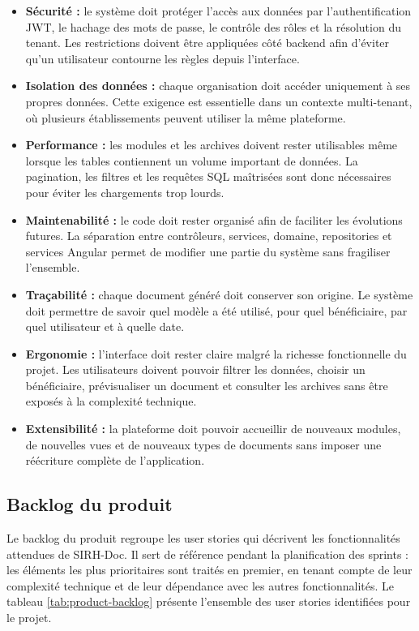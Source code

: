 \begin{itemize}
    \item \textbf{Sécurité :} le système doit protéger l'accès aux données par l'authentification JWT, le hachage des mots de passe, le contrôle des rôles et la résolution du tenant. Les restrictions doivent être appliquées côté backend afin d'éviter qu'un utilisateur contourne les règles depuis l'interface.
    \item \textbf{Isolation des données :} chaque organisation doit accéder uniquement à ses propres données. Cette exigence est essentielle dans un contexte multi-tenant, où plusieurs établissements peuvent utiliser la même plateforme.
    \item \textbf{Performance :} les modules et les archives doivent rester utilisables même lorsque les tables contiennent un volume important de données. La pagination, les filtres et les requêtes SQL maîtrisées sont donc nécessaires pour éviter les chargements trop lourds.
    \item \textbf{Maintenabilité :} le code doit rester organisé afin de faciliter les évolutions futures. La séparation entre contrôleurs, services, domaine, repositories et services Angular permet de modifier une partie du système sans fragiliser l'ensemble.
    \item \textbf{Traçabilité :} chaque document généré doit conserver son origine. Le système doit permettre de savoir quel modèle a été utilisé, pour quel bénéficiaire, par quel utilisateur et à quelle date.
    \item \textbf{Ergonomie :} l'interface doit rester claire malgré la richesse fonctionnelle du projet. Les utilisateurs doivent pouvoir filtrer les données, choisir un bénéficiaire, prévisualiser un document et consulter les archives sans être exposés à la complexité technique.
    \item \textbf{Extensibilité :} la plateforme doit pouvoir accueillir de nouveaux modules, de nouvelles vues et de nouveaux types de documents sans imposer une réécriture complète de l'application.
\end{itemize}

\subsection{Backlog du produit}

Le backlog du produit regroupe les user stories qui décrivent les fonctionnalités attendues de SIRH-Doc. Il sert de référence pendant la planification des sprints : les éléments les plus prioritaires sont traités en premier, en tenant compte de leur complexité technique et de leur dépendance avec les autres fonctionnalités. Le tableau \ref{tab:product-backlog} présente l’ensemble des user stories identifiées pour le projet.

